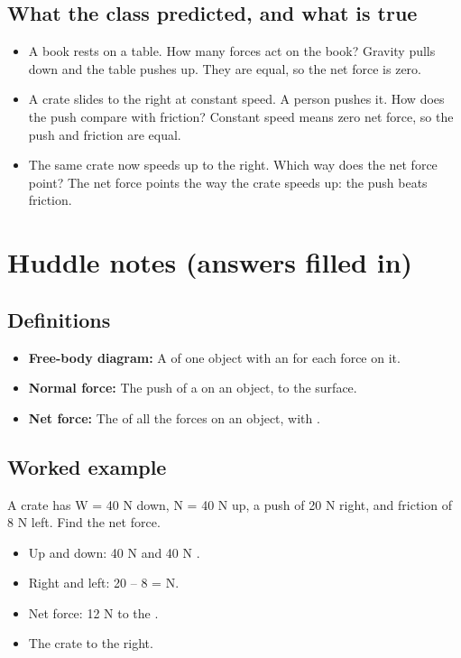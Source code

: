 \documentclass[11pt]{article}
\begin{document}
\subsection*{What the class predicted, and what is true}\begin{itemize}
\item A book rests on a table. How many forces act on the book?  Gravity pulls down and the table pushes up. They are equal, so the net force is zero.
\item A crate slides to the right at constant speed. A person pushes it. How does the push compare with friction?  Constant speed means zero net force, so the push and friction are equal.
\item The same crate now speeds up to the right. Which way does the net force point?  The net force points the way the crate speeds up: the push beats friction.
\end{itemize}
\section*{Huddle notes (answers filled in)}
\subsection*{Definitions}\begin{itemize}
\item \textbf{Free-body diagram:} A  of one object with an  for each force on it.
\item \textbf{Normal force:} The push of a  on an object,  to the surface.
\item \textbf{Net force:} The  of all the forces on an object, with .
\end{itemize}
\subsection*{Worked example}
A crate has W = 40 N down, N = 40 N up, a push of 20 N right, and friction of 8 N left. Find the net force.\\
\begin{itemize}
\item Up and down: 40 N and 40 N .
\item Right and left: 20 -- 8 =  N.
\item Net force: 12 N to the .
\item The crate  to the right.
\end{itemize}
\end{document}
